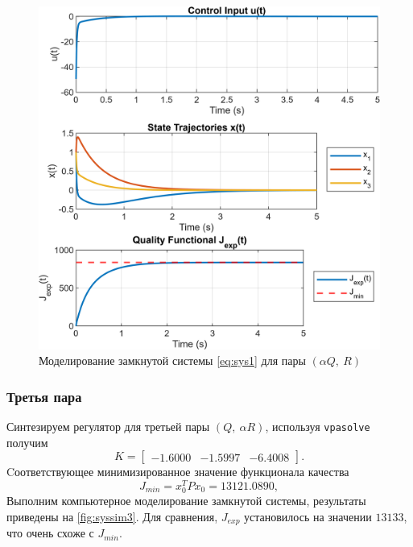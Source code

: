 \begin{figure}[H]
    \centering
    \includegraphics[width=1\linewidth]{figs/1_sim2.png}
    \caption{Моделирование замкнутой системы \eqref{eq:sys1} для пары $(\alpha Q,\ R)$}
    \label{fig:syssim2}
\end{figure}

\subsubsection{Третья пара}

Синтезируем регулятор для третьей пары $(Q,\ \alpha R)$, используя \texttt{vpasolve}
получим
\begin{equation*}
    K=\begin{bmatrix}
        -1.6000  & -1.5997  & -6.4008
    \end{bmatrix}.
\end{equation*}
Cоответствующее минимизированное значение функционала качества
\begin{equation*}
    J_{min}=x_0^TPx_0=13121.0890,
\end{equation*}
Выполним компьютерное моделирование замкнутой системы,
результаты приведены на \autoref{fig:syssim3}. Для сравнения, $J_{exp}$ установилось на
значении $13133$, что очень схоже с $J_{min}$.

